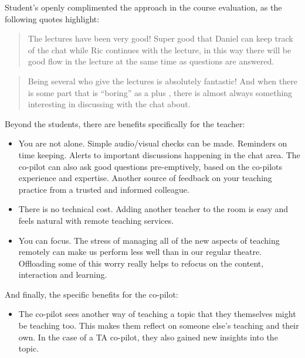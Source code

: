 \documentclass[sigconf,natbib=false]{acmart}
\begin{document}
\noindent
Student's openly complimented the approach in the course evaluation, as the following quotes highlight:

\begin{quote}
The lectures have been very good! Super good that Daniel can keep track of the chat while Ric continues with the lecture, in this way there will be good flow in the lecture at the same time as questions are answered.
\end{quote}

\begin{quote}
Being several who give the lectures is absolutely fantastic! And when there is some part that is \enquote{boring} as a plus , there is almost always something interesting in discussing with the chat about.
\end{quote}

\noindent
Beyond the students, there are benefits specifically for the teacher:

\begin{itemize}
  \item You are not alone. Simple audio/visual checks can be made. Reminders on time keeping. Alerts to important discussions happening in the chat area. The co-pilot can also ask good questions pre-emptively, based on the co-pilots experience and expertise. Another source of feedback on your teaching practice from a trusted and informed colleague.

  \item There is no technical cost. Adding another teacher to the room is easy and feels natural with remote teaching services.

  \item You can focus. The stress of managing all of the new aspects of teaching remotely can make us perform less well than in our regular theatre. Offloading some of this worry really helps to refocus on the content, interaction and learning.
\end{itemize}

\noindent
And finally, the specific benefits for the co-pilot:

\begin{itemize}
  \item The co-pilot sees another way of teaching a topic that they themselves might be teaching too. This makes them reflect on someone else's teaching and their own. In the case of a TA co-pilot, they also gained new insights into the topic.
\end{itemize}
\end{document}
